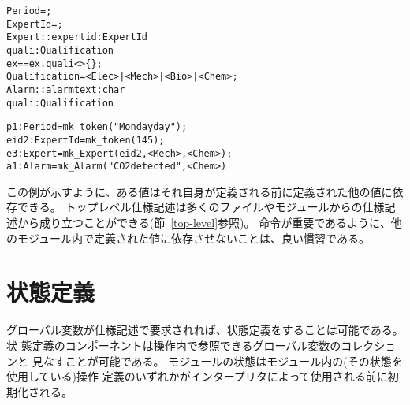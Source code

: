 \documentclass[\pformat,12pt]{jarticle}
\begin{document}
\begin{description}
\begin{alltt}
     Period = ;
     ExpertId = ;
     Expert :: expertid : ExpertId
               quali :  Qualification
      ex == ex.quali <> \{\};
     Qualification = <Elec> | <Mech> | <Bio> | <Chem>;
     Alarm :: alarmtext :  char
              quali : Qualification

 
     \PUBLIC p1: Period = mk_token("Monday day");
     \PRIVATE eid2 : ExpertId = mk_token(145);
     \PROTECTED e3 : Expert = mk_Expert(eid2, { <Mech>, <Chem> });
     \mbox{} a1 : Alarm = mk_Alarm("CO2 detected", <Chem>)
\end{alltt}
 この例が示すように、ある値はそれ自身が定義される前に定義された他の値に依存できる。
  トップレベル仕様記述は多くのファイルやモジュールからの仕様記述から成り立つことができる(節~\ref{top-level}参照)。 
  命令が重要であるように、他のモジュール内で定義された値に依存させないことは、良い慣習である。
\end{description}


\section{状態定義}\label{statedef}

グローバル変数が仕様記述で要求されれば、状態定義をすることは可能である。状
態定義のコンポーネントは操作内で参照できるグローバル変数のコレクションと
見なすことが可能である。
モジュールの状態はモジュール内の(その状態を使用している)操作
定義のいずれかがインタープリタによって使用される前に初期化される。
\end{document}
